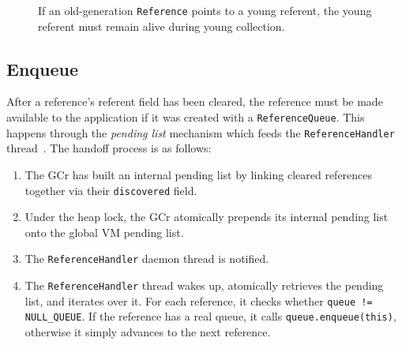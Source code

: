 \begin{figure}[t]
\centering
{}
\caption[Cross-generational reference case]{If an old-generation \texttt{Reference} points to a young referent, the young referent must remain alive during young collection.}
\label{fig:cross-gen-reference}
\end{figure}

\subsection{Enqueue}
\label{subsec:bg-refproc-enqueue}

After a reference's referent field has been cleared, the reference must be made available to the application if it was created with a \texttt{ReferenceQueue}. This happens through the \emph{pending list} mechanism which feeds the \texttt{ReferenceHandler} thread~\cite{openjdk-zreferenceprocessor-cpp,openjdk-reference-java}. The handoff process is as follows:

\begin{enumerate}
    \item The \ac{GCr} has built an internal pending list by linking cleared references together via their \texttt{discovered} field.
    \item Under the heap lock, the \ac{GCr} atomically prepends its internal pending list onto the global VM pending list.
    \item The \texttt{ReferenceHandler} daemon thread is notified.
    \item The \texttt{ReferenceHandler} thread wakes up, atomically retrieves the pending list, and iterates over it. For each reference, it checks whether \texttt{queue != NULL\_QUEUE}. If the reference has a real queue, it calls \texttt{queue.enqueue(this)}, otherwise it simply advances to the next reference.
\end{enumerate}

